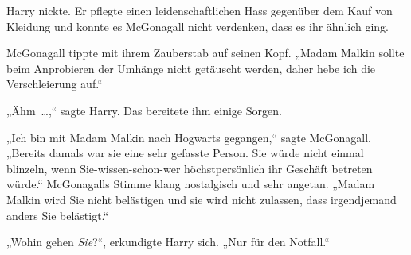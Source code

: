 Harry nickte. Er pflegte einen leidenschaftlichen Hass gegenüber dem Kauf von Kleidung und konnte es McGonagall nicht verdenken, dass es ihr ähnlich ging.

McGonagall tippte mit ihrem Zauberstab auf seinen Kopf. „Madam Malkin sollte beim Anprobieren der Umhänge nicht getäuscht werden, daher hebe ich die Verschleierung auf.“

„Ähm …,“ sagte Harry. Das bereitete ihm einige Sorgen.

„Ich bin mit Madam Malkin nach Hogwarts gegangen,“ sagte McGonagall. „Bereits damals war sie eine sehr gefasste Person. Sie würde nicht einmal blinzeln, wenn Sie-wissen-schon-wer höchstpersönlich ihr Geschäft betreten würde.“ McGonagalls Stimme klang nostalgisch und sehr angetan. „Madam Malkin wird Sie nicht belästigen und sie wird nicht zulassen, dass irgendjemand anders Sie belästigt.“

„Wohin gehen \emph{Sie}?“, erkundigte Harry sich. „Nur für den Notfall.“

